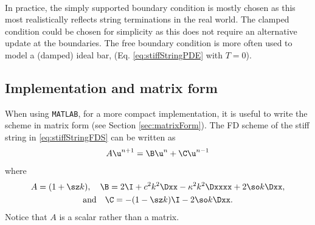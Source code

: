 \\

In practice, the simply supported boundary condition is mostly chosen as this most realistically reflects string terminations in the real world. The clamped condition could be chosen for simplicity as this does not require an alternative update at the boundaries. The free boundary condition is more often used to model a (damped) ideal bar, (Eq. \eqref{eq:stiffStringPDE} with $T = 0$).

\subsection{Implementation and matrix form}\label{sec:implementationStiffString}
When using \texttt{MATLAB}, for a more compact implementation, it is useful to write the scheme in matrix form (see Section \ref{sec:matrixForm}). The FD scheme of the stiff string in \eqref{eq:stiffStringFDS} can be written as 
\begin{equation}\label{eq:matrixFormStiffString}
    A\u^{n+1} = \B\u^n + \C \u^{n-1}
\end{equation}
where 
\begin{equation}
    \begin{gathered}
    A = (1+\sz k), \quad \B = 2\I + c^2 k^2 \Dxx - \kappa^2 k^2 \Dxxxx + 2 \so k \Dxx, \\
    \text{and} \quad \C = -(1-\sz k)\I - 2\so k \Dxx.
    \end{gathered}
\end{equation}
Notice that $A$ is a scalar rather than a matrix.

